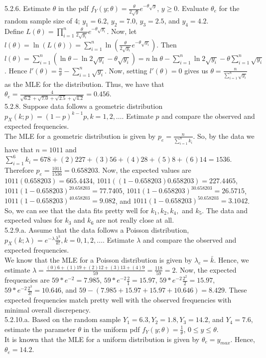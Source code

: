 \documentclass[12pt]{article}
\begin{document}
5.2.6. Estimate $\theta$ in the pdf $f_Y(y;\theta)=\frac{\theta}{2\sqrt{y}}e^{-\theta\sqrt{y}}$, $y\geq0$. Evaluate $\theta_e$ for the random sample size of 4; $y_1=6.2$, $y_2=7.0$, $y_3=2.5$, and $y_4=4.2$.\\
Define $L(\theta)=\prod_{i=1}^n\frac{\theta}{2\sqrt{y_i}}e^{-\theta\sqrt{y_i}}$. Now, let $l(\theta)=\ln(L(\theta))=\sum_{i=1}^n\ln(\frac{\theta}{2\sqrt{y_i}}e^{-\theta\sqrt{y_i}})$. Then $l(\theta)=\sum_{i=1}^n(\ln\theta-\ln2\sqrt{y_i}-\theta\sqrt{y_i})=n\ln\theta-\sum_{i=1}^n\ln2\sqrt{y_i}-\theta\sum_{i=1}^n\sqrt{y_i}$. Hence $l'(\theta)=\frac{n}{\theta}-\sum_{i=1}^n\sqrt{y_i}$. Now, setting $l'(\theta)=0$ gives us $\theta=\frac{n}{\sum_{i=1}^n\sqrt{y_i}}$ as the MLE for the distribution. Thus, we have that $\theta_e=\frac{4}{\sqrt{6.2}+\sqrt{7.0}+\sqrt{2.5}+\sqrt{4.2}}=0.456$.\\[20pt]

5.2.8. Suppose data follows a geometric distribution $p_X(k;p)=(1-p)^{k-1}p, k=1,2,\dotsc$. Estimate $p$ and compare the observed and expected frequencies.\\
The MLE for a geometric distribution is given by $p_e=\frac{n}{\sum_{i=1}^nk_i}$. So, by the data we have that $n=1011$ and $\sum_{i=1}^6k_i=678+(2)227+(3)56+(4)28+(5)8+(6)14=1536$. Therefore $p_e=\frac{1011}{1536}=0.658203$. Now, the expected values are $1011(0.658203)=665.4434$, $1011((1-0.658203)0.658203)=227.4465$, $1011(1-0.658203)^20.658203=77.7405$, $1011(1-0.658203)^30.658203=26.5715$, $1011(1-0.658203)^40.658203=9.082$, and $1011(1-0.658203)^50.658203=3.1042$. So, we can see that the data fits pretty well for $k_1, k_2, k_4,$ and $k_5$. The data and expected values for $k_3$ and $k_6$ are not really close at all.\\[20pt]

5.2.9.a. Assume that the data follows a Poisson distribution, $p_X(k;\lambda)=e^{-\lambda}\frac{\lambda^k}{k!}, k=0,1,2,\dotsc$. Estimate $\lambda$ and compare the observed and expected frequencies.\\
We know that the MLE for a Poisson distribution is given by $\lambda_e=\bar{k}$. Hence, we estimate $\lambda=\frac{(0)6+(1)19+(2)12+(3)13+(4)9}{59}=\frac{118}{59}=2$. Now, the expected frequencies are $59*e^{-2}=7.985$, $59*e^{-2}\frac{2}{1}=15.97$, $59*e^{-2}\frac{2^2}{2}=15.97$, $59*e^{-2}\frac{2^3}{3!}=10.646$, and $59-(7.985+15.97+15.97+10.646)=8.429$. These expected frequencies match pretty well with the observed frequencies with minimal overall discrepency.\\[20pt]

5.2.10.a. Based on the random sample $Y_1=6.3, Y_2=1.8, Y_3=14.2$, and $Y_4=7.6$, estimate the parameter $\theta$ in the uniform pdf $f_Y(y;\theta)=\frac{1}{\theta}$, $0\leq y\leq\theta$.\\
It is known that the MLE for a uniform distribution is given by $\theta_e=y_{max}$. Hence, $\theta_e=14.2$.
\end{document}

